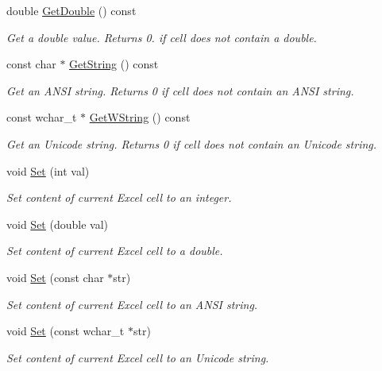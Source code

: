 \begin{DoxyCompactItemize}
double \hyperlink{class_y_excel_1_1_basic_excel_cell_adddf212804f649bfbca5329b8c34b5fa}{Get\+Double} () const 
\begin{DoxyCompactList}\small\item\em Get a double value. Returns 0. if cell does not contain a double. \end{DoxyCompactList}\item 
const char $\ast$ \hyperlink{class_y_excel_1_1_basic_excel_cell_a73f2b25fc3da37c533de2aaa1186ebfd}{Get\+String} () const 
\begin{DoxyCompactList}\small\item\em Get an A\+N\+S\+I string. Returns 0 if cell does not contain an A\+N\+S\+I string. \end{DoxyCompactList}\item 
const wchar\+\_\+t $\ast$ \hyperlink{class_y_excel_1_1_basic_excel_cell_a9d5aabe1efc4de29a51063b308a6949b}{Get\+W\+String} () const 
\begin{DoxyCompactList}\small\item\em Get an Unicode string. Returns 0 if cell does not contain an Unicode string. \end{DoxyCompactList}\item 
void \hyperlink{class_y_excel_1_1_basic_excel_cell_a18001f12f853f12dd28d40af66a29fa5}{Set} (int val)
\begin{DoxyCompactList}\small\item\em Set content of current Excel cell to an integer. \end{DoxyCompactList}\item 
void \hyperlink{class_y_excel_1_1_basic_excel_cell_a98daa58a6325a20f801579e3bc23282b}{Set} (double val)
\begin{DoxyCompactList}\small\item\em Set content of current Excel cell to a double. \end{DoxyCompactList}\item 
void \hyperlink{class_y_excel_1_1_basic_excel_cell_a5697b81458fa089cedd53451c9188438}{Set} (const char $\ast$str)
\begin{DoxyCompactList}\small\item\em Set content of current Excel cell to an A\+N\+S\+I string. \end{DoxyCompactList}\item 
void \hyperlink{class_y_excel_1_1_basic_excel_cell_a6eb319f73d522972f1136606e77cd773}{Set} (const wchar\+\_\+t $\ast$str)
\begin{DoxyCompactList}\small\item\em Set content of current Excel cell to an Unicode string. \end{DoxyCompactList}\item 

\end{DoxyCompactItemize}
